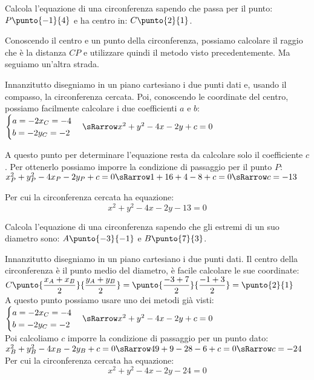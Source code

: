 \begin{esempio}
Calcola l'equazione di una circonferenza sapendo che passa per il punto:
\(P\punto{-1}{4}\) e ha centro in: \(C\punto{2}{1}\).

Conoscendo il centro e un punto della circonferenza, possiamo calcolare il 
raggio che è la distanza \(CP\) e utilizzare quindi il metodo visto 
precedentemente. 
Ma seguiamo un'altra strada. 

Innanzitutto disegniamo in un piano cartesiano i 
due punti dati e, usando il compasso, la circonferenza cercata.
Poi, conoscendo le coordinate del centro, possiamo facilmente calcolare i due 
coefficienti \(a\) e \(b\): \\
\(\sistema{a = -2x_C = -4 \\ b = -2y_C = -2} \sRarrow x^2 +y^2 -4x -2y +c = 0\) 

A questo punto per determinare l'equazione resta da calcolare solo il 
coefficiente \(c\). Per ottenerlo possiamo imporre la condizione di passaggio 
per il punto \(P\): \\
\(x_P^2 +y_P^2 -4x_P -2y_P +c = 0 \sRarrow 1 + 16 +4 -8 +c = 0 \sRarrow 
  c = -13\)

Per cui la circonferenza cercata ha equazione:
\[x^2 +y^2 -4x -2y -13 = 0\]
\end{esempio}

\begin{esempio}
Calcola l'equazione di una circonferenza sapendo che gli estremi di un suo 
diametro sono:
\(A\punto{-3}{-1}\) e \(B\punto{7}{3}\).

Innanzitutto disegniamo in un piano cartesiano i due punti dati.
Il centro della circonferenza è il punto medio del diametro, è 
facile calcolare le sue coordinate: \\[3pt]
\(C\punto{\dfrac{x_A + x_B}{2}}{\dfrac{y_A + y_B}{2}} = 
\punto{\dfrac{-3 + 7}{2}}{\dfrac{-1 + 3}{2}} = \punto{2}{1}\)
\\[3pt]
A questo punto possiamo usare uno dei metodi già visti:\\
\(\sistema{a = -2x_C = -4 \\ b = -2y_C = -2} \sRarrow x^2 +y^2 -4x -2y +c = 0\) 
\\[3pt]
Poi calcoliamo \(c\) imporre la condizione di passaggio per un punto dato: \\[3pt]
\(x_B^2 +y_B^2 -4x_B -2y_B +c = 0 \sRarrow 49 + 9 -28 -6 +c = 0 \sRarrow 
  c = -24\)
\\[3pt]
Per cui la circonferenza cercata ha equazione:
\[x^2 +y^2 -4x -2y -24 = 0\]
\end{esempio}

